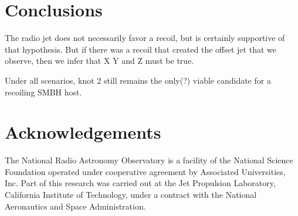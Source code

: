 \documentclass[useAMS,usenatbib]{emulateapj}
\newcommand{\fixme}[1]{{\color{red} #1 }}
\begin{document}
%







\section{Conclusions}
The radio jet does not necessarily favor a recoil, but is certainly supportive of that hypothesis. But if there was a recoil that created the offset jet that we observe, then we infer that X Y and Z must be true.

\fixme{Under all scenarios, knot 2 still remains the only(?) viable candidate for a recoiling SMBH host.}

\section{Acknowledgements}
The National Radio Astronomy Observatory is a facility of the National Science Foundation operated under cooperative agreement by Associated Universities, Inc.
Part of this research was carried out at the Jet Propulsion Laboratory, California Institute of Technology, under a contract with the National Aeronautics and Space Administration.
\end{document}
